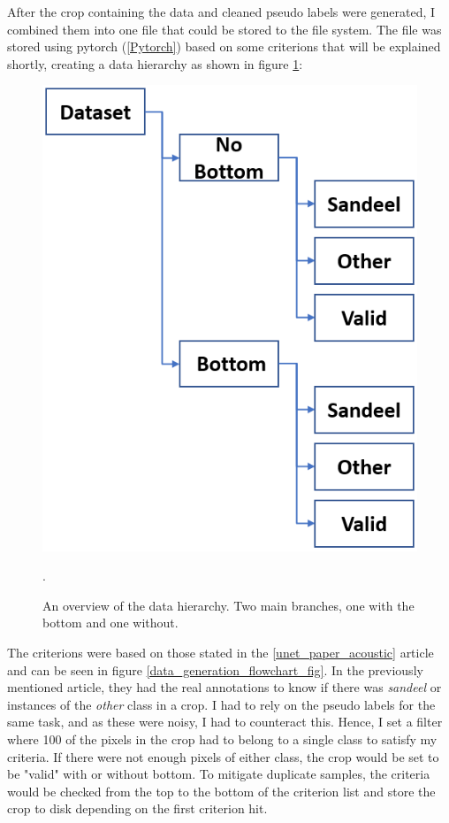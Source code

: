         After the crop containing the data and cleaned pseudo labels were generated, I combined them into one file that could be stored to the file system. The file was stored using pytorch (\ref{Pytorch}) based on some criterions that will be explained shortly, creating a data hierarchy as shown in figure \ref{data_hierarchy_fig}:
        
        
        \clearpage
        \begin{figure}[H]
            \centering
            \includegraphics[scale=0.5]{figures/data_hierarki.png}
            \caption[The data-hierarchy]{An overview of the data hierarchy. Two main branches, one with the bottom and one without.}.
          	\medskip 
            \label{data_hierarchy_fig}
        \end{figure}
        
        The criterions were based on those stated in the \ref{unet_paper_acoustic} article and can be seen in figure \ref{data_generation_flowchart_fig}. In the previously mentioned article, they had the real annotations to know if there was \textit{sandeel} or instances of the \textit{other} class in a crop. I had to rely on the pseudo labels for the same task, and as these were noisy, I had to counteract this. Hence, I set a filter where 100 of the pixels in the crop had to belong to a single class to satisfy my criteria. If there were not enough pixels of either class, the crop would be set to be "valid" with or without bottom. To mitigate duplicate samples, the criteria would be checked from the top to the bottom of the criterion list and store the crop to disk depending on the first criterion hit.
        
